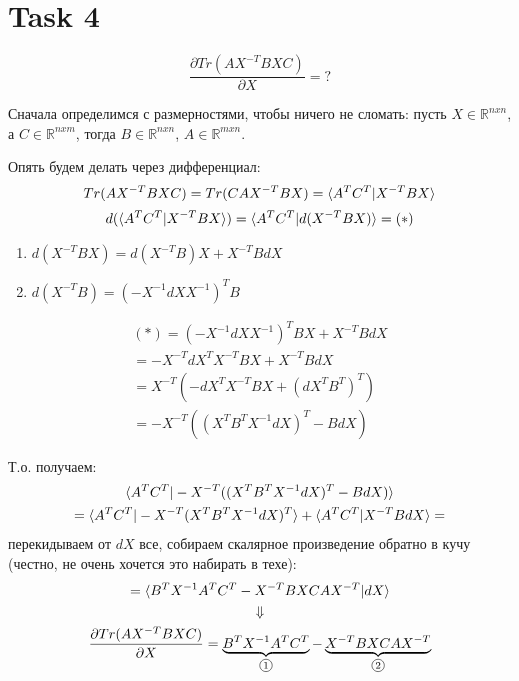 
\section{Task 4}
\begin{task}
    \begin{equation}
        \frac{\partial Tr(AX^{-T}BXC)}{\partial X} = ?
    \end{equation}
\end{task}


\begin{solution}
    Сначала определимся с размерностями, чтобы ничего не сломать: пусть $X \in \mathbb{R}^{n x n}$, а $C \in \mathbb{R}^{n x m}$, тогда $B \in \mathbb{R}^{n x n}$, $A \in \mathbb{R}^{m x n}$.

    Опять будем делать через дифференциал:
    \begin{equation}
        Tr(AX^{-T}BXC) = Tr(CAX^{-T}BX) = \braket{A^TC^T | X^{-T}BX}
    \end{equation}
    \begin{gather}
        d(\braket{A^TC^T | X^{-T}BX}) = \braket{A^TC^T | d(X^{-T}BX)} = (*)
    \end{gather}

    \begin{enumerate}
        \item $d(X^{-T}BX) = d(X^{-T}B)X + X^{-T}BdX$
        \item $d(X^{-T} B) = (-X^{-1} dX X^{-1})^T B$
    \end{enumerate}

    \begin{gather}
        (*) = (-X^{-1} dX X^{-1})^T B X + X^{-T} B dX \\
        = -X^{-T} dX^T X^{-T} B X + X^{-T} B dX \\
        = X^{-T} (-dX^T X^{-T} B X + (dX^T B^T)^T) \\
        = -X^{-T}((X^T B^T X^{-1} dX)^T - B dX)
    \end{gather}

    Т.о. получаем:
    \begin{gather}
        \braket{A^T C^T | -X^{-T}((X^T B^T X^{-1} dX)^T - B dX)} \\
        = \braket{A^T C^T | -X^{-T} (X^T B^T X^{-1} dX)^T} + \braket{A^T C^T | X^{-T} B dX} =
    \end{gather}
    перекидываем от $dX$ все, собираем скалярное произведение обратно в кучу (честно, не очень хочется это набирать в техе):
    \begin{gather}
        = \braket{B^T X^{-1} A^T C^T - X^{-T} B X C A X^{-T} | dX} \\
        \Downarrow \\
        \frac{\partial Tr(AX^{-T}BXC)}{\partial X} = \underbrace{B^T X^{-1} A^T C^T}_{\mathcircled{1}} - \underbrace{X^{-T} B X C A X^{-T}}_{\mathcircled{2}}
    \end{gather}


\end{solution}
